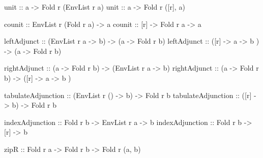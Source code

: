 \documentclass[]{article}
\newenvironment{Shaded}{}{}
\newcommand{\DataTypeTok}[1]{\textcolor[rgb]{0.56,0.13,0.00}{#1}}
\newcommand{\NormalTok}[1]{#1}
\newcommand{\OtherTok}[1]{\textcolor[rgb]{0.00,0.44,0.13}{#1}}
\begin{document}
\begin{Shaded}
\begin{Highlighting}[]
\OtherTok{unit ::}\NormalTok{ a }\OtherTok{{-}>} \DataTypeTok{Fold}\NormalTok{ r (}\DataTypeTok{EnvList}\NormalTok{ r a)}
\OtherTok{unit ::}\NormalTok{ a }\OtherTok{{-}>} \DataTypeTok{Fold}\NormalTok{ r ([r], a)}

\OtherTok{counit ::} \DataTypeTok{EnvList}\NormalTok{ r (}\DataTypeTok{Fold}\NormalTok{ r a) }\OtherTok{{-}>}\NormalTok{ a}
\OtherTok{counit ::}\NormalTok{ [r] }\OtherTok{{-}>} \DataTypeTok{Fold}\NormalTok{ r a }\OtherTok{{-}>}\NormalTok{ a}

\OtherTok{leftAdjunct ::}\NormalTok{ (}\DataTypeTok{EnvList}\NormalTok{ r a }\OtherTok{{-}>}\NormalTok{ b) }\OtherTok{{-}>}\NormalTok{ (a }\OtherTok{{-}>} \DataTypeTok{Fold}\NormalTok{ r b)}
\OtherTok{leftAdjunct ::}\NormalTok{ ([r] }\OtherTok{{-}>}\NormalTok{ a }\OtherTok{{-}>}\NormalTok{ b   ) }\OtherTok{{-}>}\NormalTok{ (a }\OtherTok{{-}>} \DataTypeTok{Fold}\NormalTok{ r b)}

\OtherTok{rightAdjunct ::}\NormalTok{ (a }\OtherTok{{-}>} \DataTypeTok{Fold}\NormalTok{ r b) }\OtherTok{{-}>}\NormalTok{ (}\DataTypeTok{EnvList}\NormalTok{ r a }\OtherTok{{-}>}\NormalTok{ b)}
\OtherTok{rightAdjunct ::}\NormalTok{ (a }\OtherTok{{-}>} \DataTypeTok{Fold}\NormalTok{ r b) }\OtherTok{{-}>}\NormalTok{ ([r] }\OtherTok{{-}>}\NormalTok{ a }\OtherTok{{-}>}\NormalTok{ b   )}

\OtherTok{tabulateAdjunction ::}\NormalTok{ (}\DataTypeTok{EnvList}\NormalTok{ r () }\OtherTok{{-}>}\NormalTok{ b) }\OtherTok{{-}>} \DataTypeTok{Fold}\NormalTok{ r b}
\OtherTok{tabulateAdjunction ::}\NormalTok{ ([r] }\OtherTok{{-}>}\NormalTok{ b)          }\OtherTok{{-}>} \DataTypeTok{Fold}\NormalTok{ r b}

\OtherTok{indexAdjunction ::} \DataTypeTok{Fold}\NormalTok{ r b }\OtherTok{{-}>} \DataTypeTok{EnvList}\NormalTok{ r a }\OtherTok{{-}>}\NormalTok{ b}
\OtherTok{indexAdjunction ::} \DataTypeTok{Fold}\NormalTok{ r b }\OtherTok{{-}>}\NormalTok{ [r]         }\OtherTok{{-}>}\NormalTok{ b}

\OtherTok{zipR ::} \DataTypeTok{Fold}\NormalTok{ r a }\OtherTok{{-}>} \DataTypeTok{Fold}\NormalTok{ r b }\OtherTok{{-}>} \DataTypeTok{Fold}\NormalTok{ r (a, b)}
\end{Highlighting}
\end{Shaded}
\end{document}
